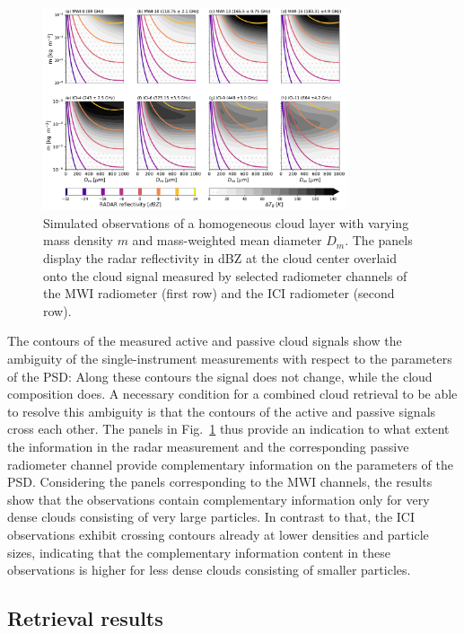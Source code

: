 \documentclass[journal abbreviation, manuscript]{copernicus}
\begin{document}
\begin{figure}
\centering
\includegraphics[width = 0.8\textwidth]{../plots/contours}
\caption{Simulated observations of a homogeneous cloud layer with
varying mass density $m$ and mass-weighted mean diameter $D_m$. The panels
display the radar reflectivity in dBZ at the cloud center overlaid onto the
cloud signal measured by selected radiometer channels of the MWI radiometer
(first row) and the ICI radiometer (second row).}
\label{fig:contours}
\end{figure}

The contours of the measured active and passive cloud signals show the ambiguity
of the single-instrument measurements with respect to the parameters of the PSD:
Along these contours the signal does not change, while the cloud composition
does. A necessary condition for a combined cloud retrieval to be able to resolve
this ambiguity is that the contours of the active and passive signals cross each
other. The panels in Fig.~\ref{fig:contours} thus provide an indication to what
extent the information in the radar measurement and the corresponding passive
radiometer channel provide complementary information on the parameters of the
PSD. Considering the panels corresponding to the MWI channels, the results show
that the observations contain complementary information only for very dense
clouds consisting of very large particles. In contrast to that, the ICI
observations exhibit crossing contours already at lower densities and particle
sizes, indicating that the complementary information content in these observations
is higher for less dense clouds consisting of smaller particles.

\subsection{Retrieval results}
\end{document}
